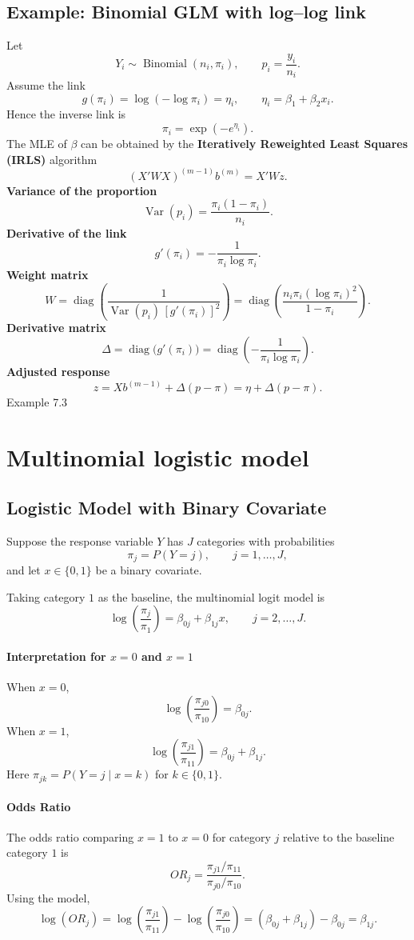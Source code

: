 \documentclass[11pt]{article}
\theoremstyle{definition}
\begin{document}
\subsection*{Example: Binomial GLM with log–log link}
Let
\[
Y_i \sim \operatorname{Binomial}(n_i,\pi_i),
\qquad
p_i=\frac{y_i}{n_i}.
\]
Assume the link
\[
g(\pi_i)=\log(-\log \pi_i)=\eta_i,
\qquad
\eta_i=\beta_1+\beta_2 x_i .
\]
Hence the inverse link is
\[
\pi_i
=
\exp(-e^{\eta_i}).
\]
The MLE of $\beta$ can be obtained by the
\textbf{Iteratively Reweighted Least Squares (IRLS)} algorithm
\[
(X'WX)^{(m-1)} b^{(m)} = X'Wz .
\]
\textbf{Variance of the proportion}
\[
\operatorname{Var}(p_i)=\frac{\pi_i(1-\pi_i)}{n_i}.
\]
\textbf{Derivative of the link}
\[
g'(\pi_i)
=
-\frac{1}{\pi_i \log \pi_i}.
\]
\textbf{Weight matrix}
\[
W
=
\operatorname{diag}\!\left(
\frac{1}{\operatorname{Var}(p_i)\,[g'(\pi_i)]^2}
\right)
=
\operatorname{diag}\!\left(
\frac{n_i \pi_i (\log \pi_i)^2}{1-\pi_i}
\right).
\]
\textbf{Derivative matrix}
\[
\Delta
=
\operatorname{diag}\!\big(g'(\pi_i)\big)
=
\operatorname{diag}\!\left(
-\frac{1}{\pi_i \log \pi_i}
\right).
\]
\textbf{Adjusted response}
\[
z
=
X b^{(m-1)}+\Delta(p-\pi)
=
\eta+\Delta(p-\pi).
\]
Example 7.3
\newpage
\section{Multinomial logistic model}
\subsection{Logistic Model with Binary Covariate}
Suppose the response variable $Y$ has $J$ categories with probabilities
\[
\pi_j = P(Y=j), \qquad j=1,\dots,J,
\]
and let $x \in \{0,1\}$ be a binary covariate.

Taking category $1$ as the baseline, the multinomial logit model is
\[
\log\left(\frac{\pi_j}{\pi_1}\right)
=
\beta_{0j} + \beta_{1j}x,
\qquad j=2,\dots,J.
\]

\paragraph{Interpretation for $x=0$ and $x=1$}
When $x=0$,
\[
\log\left(\frac{\pi_{j0}}{\pi_{10}}\right)
=
\beta_{0j}.
\]
When $x=1$,
\[
\log\left(\frac{\pi_{j1}}{\pi_{11}}\right)
=
\beta_{0j}+\beta_{1j}.
\]
Here $\pi_{jk}=P(Y=j\mid x=k)$ for $k\in\{0,1\}$.

\paragraph{Odds Ratio}
The odds ratio comparing $x=1$ to $x=0$ for category $j$ relative to the
baseline category $1$ is
\[
OR_j
=
\frac{\pi_{j1}/\pi_{11}}{\pi_{j0}/\pi_{10}}.
\]
Using the model,
\[
\log(OR_j)
=
\log\left(\frac{\pi_{j1}}{\pi_{11}}\right)
-
\log\left(\frac{\pi_{j0}}{\pi_{10}}\right)
=
(\beta_{0j}+\beta_{1j})-\beta_{0j}
=
\beta_{1j}.
\]
\end{document}
